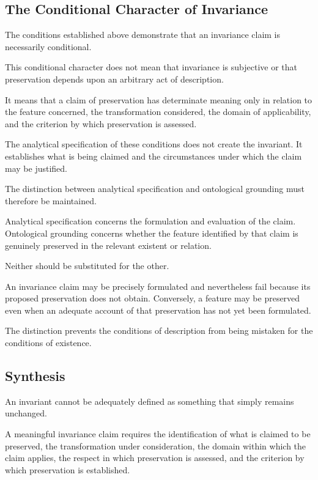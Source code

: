 \subsection{The Conditional Character of Invariance}

The conditions established above
demonstrate that an invariance claim
is necessarily conditional.

This conditional character does not
mean that invariance is subjective
or that preservation depends upon
an arbitrary act of description.

It means that a claim of preservation
has determinate meaning only in
relation to the feature concerned,
the transformation considered,
the domain of applicability, and
the criterion by which preservation
is assessed.

The analytical specification of
these conditions does not create
the invariant. It establishes what
is being claimed and the circumstances
under which the claim may be justified.

The distinction between analytical
specification and ontological grounding
must therefore be maintained.

Analytical specification concerns
the formulation and evaluation of
the claim. Ontological grounding
concerns whether the feature identified
by that claim is genuinely preserved
in the relevant existent or relation.

Neither should be substituted for
the other.

An invariance claim may be precisely
formulated and nevertheless fail
because its proposed preservation
does not obtain. Conversely, a
feature may be preserved even when
an adequate account of that preservation
has not yet been formulated.

The distinction prevents the conditions
of description from being mistaken
for the conditions of existence.

\subsection{Synthesis}

An invariant cannot be adequately
defined as something that simply
remains unchanged.

A meaningful invariance claim requires
the identification of what is claimed
to be preserved, the transformation
under consideration, the domain
within which the claim applies,
the respect in which preservation
is assessed, and the criterion
by which preservation is established.

